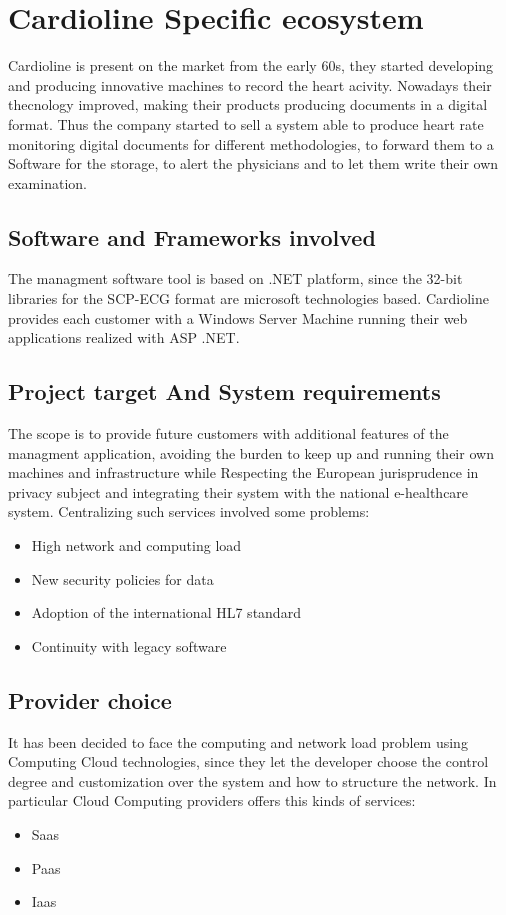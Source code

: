 \chapter{Cardioline Specific ecosystem}
\label{chapter:cardioline_specific_ecosystem}
Cardioline is present on the market from the early 60s, they started developing and producing innovative machines to record the heart acivity. Nowadays their thecnology improved, making their products producing documents in a digital format.
Thus the company started to sell a system able to produce heart rate monitoring digital documents for different methodologies, to forward them to a Software for the storage, to alert the physicians and to let them write their own examination.
\section{Software and Frameworks involved}
The managment software tool is based on .NET platform, since the 32-bit libraries for the SCP-ECG format are microsoft technologies based.
Cardioline provides each customer with a Windows Server Machine running their web applications realized with ASP .NET.
\section{Project target And System requirements}
The scope is to provide future customers with additional features of the managment application, avoiding the burden to keep up and running their own machines and infrastructure while Respecting the European jurisprudence in privacy subject and integrating their system with the national e-healthcare system.
Centralizing such services involved some problems:
\begin{itemize}
    \item High network and computing load
    \item New security policies for data
    \item Adoption of the international HL7 standard
    \item Continuity with legacy software
\end{itemize}
\section{Provider choice}
It has been decided to face the computing and network load problem using Computing Cloud technologies, since they let the developer choose the control degree and customization over the system and how to structure the network.
In particular Cloud Computing providers offers this kinds of services:
\begin{itemize}
    \item Saas
    \item Paas
    \item Iaas
\end{itemize}
